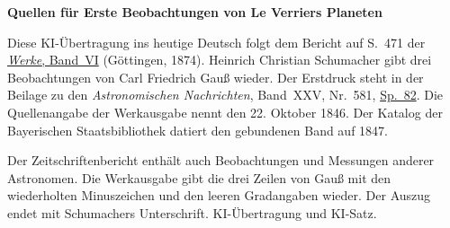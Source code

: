 \clearpage\thispagestyle{empty}
\begin{center}\textbf{Quellen für Erste Beobachtungen von Le Verriers Planeten}\end{center}
\noindent Diese KI-Übertragung ins heutige Deutsch folgt dem Bericht auf S.~471 der \href{https://gdz.sub.uni-goettingen.de/id/PPN236007467}{\textit{Werke}, Band~VI} (Göttingen, 1874). Heinrich Christian Schumacher gibt drei Beobachtungen von Carl Friedrich Gauß wieder. Der Erstdruck steht in der Beilage zu den \textit{Astronomischen Nachrichten}, Band~XXV, Nr.~581, \href{https://api.digitale-sammlungen.de/iiif/image/v2/bsb10049450_00049/full/1800,/0/default.jpg}{Sp.~82}. Die Quellenangabe der Werkausgabe nennt den 22. Oktober 1846. Der Katalog der Bayerischen Staatsbibliothek datiert den gebundenen Band auf 1847.
\par\smallskip\noindent Der Zeitschriftenbericht enthält auch Beobachtungen und Messungen anderer Astronomen. Die Werkausgabe gibt die drei Zeilen von Gauß mit den wiederholten Minuszeichen und den leeren Gradangaben wieder. Der Auszug endet mit Schumachers Unterschrift. KI-Übertragung und KI-Satz.
\clearpage
